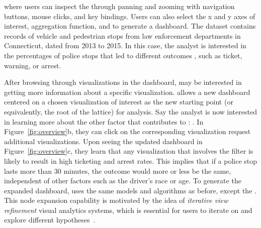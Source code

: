where users can inspect the 
through panning and zooming with navigation buttons,
mouse clicks, and key bindings.
Users can also select the x and y axes of interest,
aggregation function, and 
to generate a dashboard.
The dataset contains records of vehicle and pedestrian stops from law enforcement departments in Connecticut, dated from 2013 to 2015. In this case, the analyst is interested in the percentages of police stops  that led to different outcomes , such as ticket, warning, or arrest.

After browsing through visualizations in the dashboard,
 may be interested in getting more information
about a specific visualization.
\system allows  
a new dashboard centered on a chosen visualization
of interest as the new starting point
(or equivalently, the root of the lattice)
for analysis.
Say the analyst is now interested in learning more
about the other factor that contributes to :
.
In Figure~\ref{fig:overview}b, they
can click on the corresponding visualization
 request additional visualizations.
Upon seeing the updated dashboard in Figure~\ref{fig:overview}c,
they learn that any visualization
that involves the 
filter is likely to result in high ticketing and arrest rates.
This implies that if a police stop lasts more than 30 minutes,
the outcome would more or less be the same,
independent of other factors such as the driver's race or age. To generate the expanded dashboard, \system uses the same models and algorithms as before, except the .
This node expansion capability is motivated
by the idea of \textit{iterative view refinement}
 visual analytics systems,
which is essential for users to iterate on and
explore different hypotheses~\cite{Hoque2017,Wongsuphasawat2016}.
